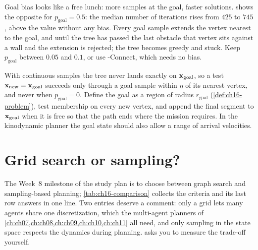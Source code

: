 \begin{pitfall}
Goal bias looks like a free lunch: more samples at the goal, faster
solutions.  shows the opposite for
$p_{\mathrm{goal}}=0.5$: the median number of iterations rises from $425$
to $745$, above the value without any bias. Every goal sample extends the
vertex nearest to the goal, and until the tree has passed the last obstacle
that vertex sits against a wall and the extension is rejected; the tree
becomes greedy and stuck. Keep $p_{\mathrm{goal}}$ between $0.05$ and
$0.1$, or use \rrt-Connect, which needs no bias.
\end{pitfall}

\begin{pitfall}
With continuous samples the tree never lands exactly on $\mathbf{x}_{\mathrm{goal}}$,
so a test $\mathbf{x}_{\mathrm{new}}=\mathbf{x}_{\mathrm{goal}}$ succeeds only through a goal
sample within $\eta$ of its nearest vertex, and never when
$p_{\mathrm{goal}}=0$. Define the goal as a region of radius
$r_{\mathrm{goal}}$ (\cref{def:ch16-problem}), test membership on every new
vertex, and append the final segment to $\mathbf{x}_{\mathrm{goal}}$ when it is free
so that the path ends where the mission requires. In the kinodynamic planner
the goal state should also allow a range of arrival velocities.
\end{pitfall}

\section{Grid search or sampling?}
\label{sec:ch16-choice}

The Week~8 milestone of the study plan is to choose between graph search and
sampling-based planning; \cref{tab:ch16-comparison} collects the criteria
and its last row answers in one line. Two entries deserve a comment: only a
grid lets many agents share one discretization, which the multi-agent
planners of \cref{ch:ch07,ch:ch08,ch:ch09,ch:ch10,ch:ch11} all need, and
only sampling in the state space respects the dynamics during planning.
 asks you to measure the trade-off yourself.

